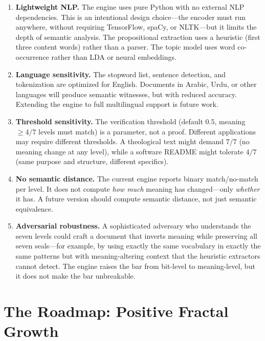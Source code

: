 \documentclass[11pt,a4paper]{article}
\begin{document}
\begin{enumerate}[nosep]
    \item \textbf{Lightweight NLP.} The engine uses pure Python with no external NLP dependencies. This is an intentional design choice---the encoder must run anywhere, without requiring TensorFlow, spaCy, or NLTK---but it limits the depth of semantic analysis. The propositional extraction uses a heuristic (first three content words) rather than a parser. The topic model uses word co-occurrence rather than LDA or neural embeddings.

    \item \textbf{Language sensitivity.} The stopword list, sentence detection, and tokenization are optimized for English. Documents in Arabic, Urdu, or other languages will produce semantic witnesses, but with reduced accuracy. Extending the engine to full multilingual support is future work.

    \item \textbf{Threshold sensitivity.} The verification threshold (default $0.5$, meaning $\geq 4/7$ levels must match) is a parameter, not a proof. Different applications may require different thresholds. A theological text might demand $7/7$ (no meaning change at any level), while a software README might tolerate $4/7$ (same purpose and structure, different specifics).

    \item \textbf{No semantic distance.} The current engine reports binary match/no-match per level. It does not compute \textit{how much} meaning has changed---only \textit{whether} it has. A future version should compute semantic distance, not just semantic equivalence.

    \item \textbf{Adversarial robustness.} A sophisticated adversary who understands the seven levels could craft a document that inverts meaning while preserving all seven seals---for example, by using exactly the same vocabulary in exactly the same patterns but with meaning-altering context that the heuristic extractors cannot detect. The engine raises the bar from bit-level to meaning-level, but it does not make the bar unbreakable.
\end{enumerate}


\section{The Roadmap: Positive Fractal Growth}
\end{document}
